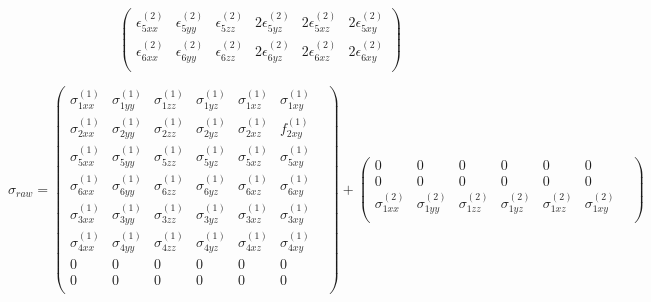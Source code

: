 \begin{equation}
\begin{pmatrix}
\epsilon_{5xx}^{\left(2\right)}&\epsilon_{5yy}^{\left(2\right)}&\epsilon_{5zz}^{\left(2\right)}&2\epsilon_{5yz}^{\left(2\right)}&2\epsilon_{5xz}^{\left(2\right)}&2\epsilon_{5xy}^{\left(2\right)} \\
\epsilon_{6xx}^{\left(2\right)}&\epsilon_{6yy}^{\left(2\right)}&\epsilon_{6zz}^{\left(2\right)}&2\epsilon_{6yz}^{\left(2\right)}&2\epsilon_{6xz}^{\left(2\right)}&2\epsilon_{6xy}^{\left(2\right)} \\
\end{pmatrix} 
\end{equation}


\begin{equation*}
\sigma_{raw} =  \begin{pmatrix}
\sigma_{1xx}^{\left(1\right)}&\sigma_{1yy}^{\left(1\right)}&\sigma_{1zz}^{\left(1\right)}&\sigma_{1yz}^{\left(1\right)}&\sigma_{1xz}^{\left(1\right)}&\sigma_{1xy}^{\left(1\right)} \\
\sigma_{2xx}^{\left(1\right)}&\sigma_{2yy}^{\left(1\right)}&\sigma_{2zz}^{\left(1\right)}&\sigma_{2yz}^{\left(1\right)}&\sigma_{2xz}^{\left(1\right)}&f_{2xy}^{\left(1\right)} \\
\sigma_{5xx}^{\left(1\right)}&\sigma_{5yy}^{\left(1\right)}&\sigma_{5zz}^{\left(1\right)}&\sigma_{5yz}^{\left(1\right)}&\sigma_{5xz}^{\left(1\right)}&\sigma_{5xy}^{\left(1\right)} \\
\sigma_{6xx}^{\left(1\right)}&\sigma_{6yy}^{\left(1\right)}&\sigma_{6zz}^{\left(1\right)}&\sigma_{6yz}^{\left(1\right)}&\sigma_{6xz}^{\left(1\right)}&\sigma_{6xy}^{\left(1\right)} \\
\sigma_{3xx}^{\left(1\right)}&\sigma_{3yy}^{\left(1\right)}&\sigma_{3zz}^{\left(1\right)}&\sigma_{3yz}^{\left(1\right)}&\sigma_{3xz}^{\left(1\right)}&\sigma_{3xy}^{\left(1\right)} \\
\sigma_{4xx}^{\left(1\right)}&\sigma_{4yy}^{\left(1\right)}&\sigma_{4zz}^{\left(1\right)}&\sigma_{4yz}^{\left(1\right)}&\sigma_{4xz}^{\left(1\right)}&\sigma_{4xy}^{\left(1\right)} \\
0 & 0 & 0 & 0 & 0 & 0 & \\ 
0 & 0 & 0 & 0 & 0 & 0 &  \\ 
\end{pmatrix} +  \begin{pmatrix}
0 & 0 & 0 & 0 & 0 & 0 &  \\ 
0 & 0 & 0 & 0 & 0 & 0 &  \\ 
\sigma_{1xx}^{\left(2\right)}&\sigma_{1yy}^{\left(2\right)}&\sigma_{1zz}^{\left(2\right)}&\sigma_{1yz}^{\left(2\right)}&\sigma_{1xz}^{\left(2\right)}&\sigma_{1xy}^{\left(2\right)} \\

\end{pmatrix}
\end{equation*}
